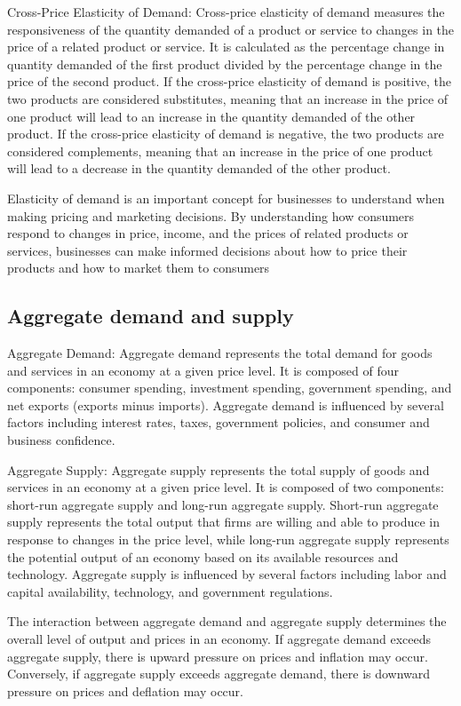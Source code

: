 \documentclass[12pt, a4paper, oneside]{article}
\begin{document}
Cross-Price Elasticity of Demand: Cross-price elasticity of demand measures the responsiveness of the quantity demanded of a product or service to changes in the price of a related product or service. It is calculated as the percentage change in quantity demanded of the first product divided by the percentage change in the price of the second product. If the cross-price elasticity of demand is positive, the two products are considered substitutes, meaning that an increase in the price of one product will lead to an increase in the quantity demanded of the other product. If the cross-price elasticity of demand is negative, the two products are considered complements, meaning that an increase in the price of one product will lead to a decrease in the quantity demanded of the other product.

Elasticity of demand is an important concept for businesses to understand when making pricing and marketing decisions. By understanding how consumers respond to changes in price, income, and the prices of related products or services, businesses can make informed decisions about how to price their products and how to market them to consumers
\subsection{ Aggregate demand and supply }
Aggregate Demand: Aggregate demand represents the total demand for goods and services in an economy at a given price level. It is composed of four components: consumer spending, investment spending, government spending, and net exports (exports minus imports). Aggregate demand is influenced by several factors including interest rates, taxes, government policies, and consumer and business confidence.

Aggregate Supply: Aggregate supply represents the total supply of goods and services in an economy at a given price level. It is composed of two components: short-run aggregate supply and long-run aggregate supply. Short-run aggregate supply represents the total output that firms are willing and able to produce in response to changes in the price level, while long-run aggregate supply represents the potential output of an economy based on its available resources and technology. Aggregate supply is influenced by several factors including labor and capital availability, technology, and government regulations.

The interaction between aggregate demand and aggregate supply determines the overall level of output and prices in an economy. If aggregate demand exceeds aggregate supply, there is upward pressure on prices and inflation may occur. Conversely, if aggregate supply exceeds aggregate demand, there is downward pressure on prices and deflation may occur.
\end{document}
